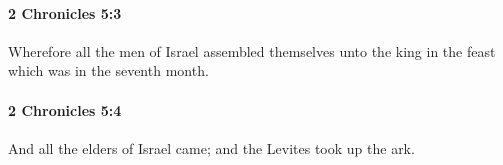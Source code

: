 		\paragraph{2 Chronicles 5:3} %
			\label{2CHRONICLES-5-3}

			Wherefore all the men of Israel assembled themselves unto the king in the feast which was in the seventh month.


		\paragraph{2 Chronicles 5:4} %
			\label{2CHRONICLES-5-4}

			And all the elders of Israel came; and the Levites took up the ark.


